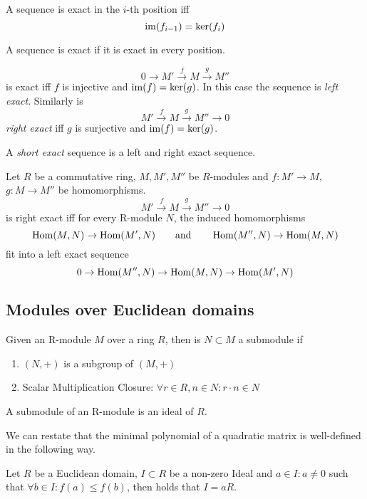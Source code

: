 \begin{definition}[Exact]
   A sequence is exact in the \(i\)-th position iff
   \[\operatorname{im}(f_{i-1}) = \ker(f_i)\]
\end{definition}

\begin{definition}
   A sequence is exact if it is exact in every position.
\end{definition}
\begin{example}
   \[0 \to M' \xrightarrow{f} M \xrightarrow{g} M''\]
   is exact iff \(f\) is injective and \(\operatorname{im}(f) = \ker(g)\).
   In this case the sequence is \emph{left exact}.
   Similarly is
   \[M' \xrightarrow{f} M \xrightarrow{g} M'' \to 0\]
   \emph{right exact} iff \(g\) is surjective and \(\operatorname{im}(f) = \ker(g)\).

   A \emph{short exact} sequence is a left and right exact sequence.
\end{example}

\begin{proposition}
   Let \(R\) be a commutative ring, \(M, M', M''\) be \(R\)-modules and \(f: M' \to M\), \(g: M \to M''\) be homomorphisms.
   \[M' \xrightarrow{f} M \xrightarrow{g} M'' \to 0\]
   is right exact iff for every R-module \(N\), the induced homomorphisms
   \[\operatorname{Hom}(M,N) \to \operatorname{Hom}(M', N) \qquad\text{and}\qquad \operatorname{Hom}(M'', N) \to \operatorname{Hom}(M, N)\]
   fit into a left exact sequence
   \[0 \to \operatorname{Hom}(M'',N) \to \operatorname{Hom}(M, N) \to \operatorname{Hom}(M', N)\]
\end{proposition}

\subsection{Modules over Euclidean domains}
\begin{definition}[Submodule]\label{def:submodule}
   Given an R-module \(M\) over a ring \(R\), then is \(N \subset M\) a submodule if
   \begin{enumerate}[label=\roman*, align=Center]
      \item \((N, +)\) is a subgroup of \((M, +)\)
      \item Scalar Multiplication Closure: \(\forall r \in R, n \in N: r \cdot n \in N\)
   \end{enumerate}
\end{definition}
\begin{remark}
   A submodule of an R-module is an ideal of \(R\).
\end{remark}
\begin{remark}
   We can restate that the minimal polynomial of a quadratic matrix is well-defined in the following way.

   Let \(R\) be a Euclidean domain, \(I \subset R\) be a non-zero Ideal and \(a \in I: a \neq 0\) such that
   \(\forall b \in I: f(a) \leq f(b)\), then holds that \(I = a R\).
\end{remark}

